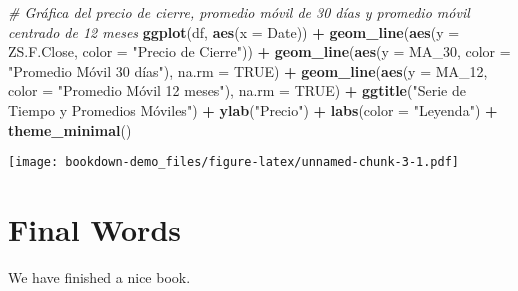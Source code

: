 \documentclass[
]{book}
\newenvironment{Shaded}{\begin{snugshade}}{\end{snugshade}}
\newcommand{\AttributeTok}[1]{\textcolor[rgb]{0.13,0.29,0.53}{#1}}
\newcommand{\CommentTok}[1]{\textcolor[rgb]{0.56,0.35,0.01}{\textit{#1}}}
\newcommand{\ConstantTok}[1]{\textcolor[rgb]{0.56,0.35,0.01}{#1}}
\newcommand{\FunctionTok}[1]{\textcolor[rgb]{0.13,0.29,0.53}{\textbf{#1}}}
\newcommand{\NormalTok}[1]{#1}
\newcommand{\SpecialCharTok}[1]{\textcolor[rgb]{0.81,0.36,0.00}{\textbf{#1}}}
\newcommand{\StringTok}[1]{\textcolor[rgb]{0.31,0.60,0.02}{#1}}
\begin{document}
\begin{Shaded}
\begin{Highlighting}[]
\CommentTok{\# Gráfica del precio de cierre, promedio móvil de 30 días y promedio móvil centrado de 12 meses}
\FunctionTok{ggplot}\NormalTok{(df, }\FunctionTok{aes}\NormalTok{(}\AttributeTok{x =}\NormalTok{ Date)) }\SpecialCharTok{+}
  \FunctionTok{geom\_line}\NormalTok{(}\FunctionTok{aes}\NormalTok{(}\AttributeTok{y =} \StringTok{\textasciigrave{}}\AttributeTok{ZS.F.Close}\StringTok{\textasciigrave{}}\NormalTok{, }\AttributeTok{color =} \StringTok{"Precio de Cierre"}\NormalTok{)) }\SpecialCharTok{+}
  \FunctionTok{geom\_line}\NormalTok{(}\FunctionTok{aes}\NormalTok{(}\AttributeTok{y =}\NormalTok{ MA\_30, }\AttributeTok{color =} \StringTok{"Promedio Móvil 30 días"}\NormalTok{), }\AttributeTok{na.rm =} \ConstantTok{TRUE}\NormalTok{) }\SpecialCharTok{+}
  \FunctionTok{geom\_line}\NormalTok{(}\FunctionTok{aes}\NormalTok{(}\AttributeTok{y =}\NormalTok{ MA\_12, }\AttributeTok{color =} \StringTok{"Promedio Móvil 12 meses"}\NormalTok{), }\AttributeTok{na.rm =} \ConstantTok{TRUE}\NormalTok{) }\SpecialCharTok{+}
  \FunctionTok{ggtitle}\NormalTok{(}\StringTok{"Serie de Tiempo y Promedios Móviles"}\NormalTok{) }\SpecialCharTok{+}
  \FunctionTok{ylab}\NormalTok{(}\StringTok{"Precio"}\NormalTok{) }\SpecialCharTok{+}
  \FunctionTok{labs}\NormalTok{(}\AttributeTok{color =} \StringTok{"Leyenda"}\NormalTok{) }\SpecialCharTok{+}
  \FunctionTok{theme\_minimal}\NormalTok{()}
\end{Highlighting}
\end{Shaded}

\texttt{[image: bookdown-demo\_files/figure-latex/unnamed-chunk-3-1.pdf]}

\hypertarget{final-words}{%
\chapter{Final Words}\label{final-words}}

We have finished a nice book.

  
\end{document}
